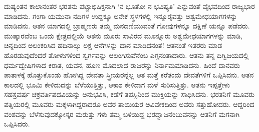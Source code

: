 ದುಷ್ಯಂತನ ಕಾಲಾನಂತರ ಭರತನು ಪಟ್ಟಾಭಿಷಿಕ್ತನಾಗಿ ‘ನ ಭೂತೋ ನ ಭವಿಷ್ಯತಿ’ ಎನ್ನುವಂತೆ ವೈಭವದಿಂದ ರಾಜ್ಯಭಾರ ಮಾಡಿದನು. ಗಂಗಾ ಯಮುನಾ ನದಿಗಳ ಉದ್ದಕ್ಕೂ ಅನೇಕ ಸ್ಥಳಗಳಲ್ಲಿ ಇನ್ನೂರೈವತ್ತು ಅಶ್ವಮೇಧಯಾಗಗಳನ್ನು ಮಾಡಿದನು. ಆತನ ಯಾಗದಲ್ಲಿ ಬ್ರಾಹ್ಮಣರು ತಮ್ಮ ಮನದಣಿಯುವಂತೆ ಗೋವುಗಳನ್ನೂ ದಕ್ಷಿಣೆ ಯನ್ನೂ ಪಡೆದರು. ಮುಷ್ಕಾರವೆಂಬ ಒಂದು ಕ್ಷೇತ್ರದಲ್ಲಿಯೆ ಆತನು ಮೂರು ಸಾವಿರದ ಮೂನ್ನೂರು ಅಶ್ವಮೇಧಯಾಗಗಳನ್ನು ಮಾಡಿ, ಚಿನ್ನದಿಂದ ಅಲಂಕರಿಸಿದ ಹದಿನಾಲ್ಕು ಲಕ್ಷ ಆನೆಗಳನ್ನು ದಾನ ಮಾಡಿದನಂತೆ! ಆತನಂತೆ ಇತರರು ಮಾಡ ಹೊರಡುವುದೆಂದರೆ ತೋಳುಗಳಿಂದ ಸ್ವರ್ಗವನ್ನು ಆಲಂಗಿಸುವೆನೆಂಬ ಎಗ್ಗನಂತಾದಾರು. ಆತನು ತನ್ನ ದಿಗ್ವಿಜಯದಲ್ಲಿ ಧರ್ಮದ್ವೇಷಿಗಳಾದ ಕಿರಾತ, ಯವನ, ಹೂಣ ಮೊದಲಾದ ರಾಜರನ್ನು ನಿರ್ನಾಮಮಾಡಿದನು. ಹಿಂದೆ ದಾನವರು ಪಾತಾಳಕ್ಕೆ ಹೊತ್ತುಕೊಂಡು ಹೋಗಿದ್ದ ದೇವತಾ ಸ್ತ್ರೀಯರನ್ನೆಲ್ಲ ಆತ ಮತ್ತೆ ಕರೆತಂದು ದೇವತೆಗಳಿಗೆ ಒಪ್ಪಿಸಿದನು. ಆತನ ಕಾಲದಲ್ಲಿ ಭೂಮಿ ಕೇಳಿದುದನ್ನು ಬೆಳೆಯುತ್ತಿತ್ತು, ಆಕಾಶ ಕೇಳಿದಾಗ ಮಳೆ ಸುರಿಸುತ್ತಿತ್ತು. ಆತನು ಇಪ್ಪತ್ತೇಳು ಸಹಸ್ರವರ್ಷ ಚಕ್ರವರ್ತಿಪದವಿಯನ್ನು ಅನುಭವಿಸಿ, ಕಡೆಗೆ ತಪಸ್ಸಿನಿಂದ ಮುಕ್ತಿಯನ್ನು ಸಾಧಿಸಿದನು. ಭರತನಿಗೆ ಮೂವರು ಪತ್ನಿಯರಲ್ಲಿ ಮೂವರು ಮಕ್ಕಳಾಗಿದ್ದರಾದರೂ ಅವರ ತಾಯಿಯರ ಅವಿವೇಕದಿಂದ ಅವರು ಸತ್ತುಹೋದರು. ಆದ್ದರಿಂದ ವಂಶವನ್ನು ಬೆಳೆಸುವುದಕ್ಕೋಸ್ಕರ ಮರುತ್ತು ಗಳು ತಮ್ಮ ಬಳಿಯಿದ್ದ ಭರದ್ವಾಜನೆಂಬುವನನ್ನು ಆತನಿಗೆ ಮಗನಾಗಿ ಒಪ್ಪಿಸಿದರು.

